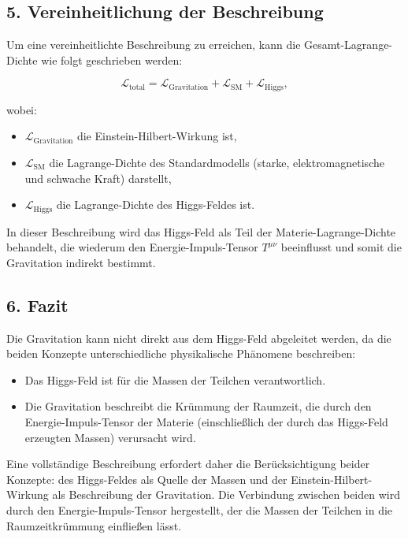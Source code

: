 \documentclass{article}
\begin{document}
	\subsection{5. Vereinheitlichung der Beschreibung}
	
	Um eine vereinheitlichte Beschreibung zu erreichen, kann die Gesamt-Lagrange-Dichte wie folgt geschrieben werden:
	
	\[
	\mathcal{L}_\text{total} = \mathcal{L}_\text{Gravitation} + \mathcal{L}_\text{SM} + \mathcal{L}_\text{Higgs},
	\]
	
	wobei:
	
	\begin{itemize}
		\item $\mathcal{L}_\text{Gravitation}$ die Einstein-Hilbert-Wirkung ist,
		\item $\mathcal{L}_\text{SM}$ die Lagrange-Dichte des Standardmodells (starke, elektromagnetische und schwache Kraft) darstellt,
		\item $\mathcal{L}_\text{Higgs}$ die Lagrange-Dichte des Higgs-Feldes ist.
	\end{itemize}
	
	In dieser Beschreibung wird das Higgs-Feld als Teil der Materie-Lagrange-Dichte behandelt, die wiederum den Energie-Impuls-Tensor $T^{\mu\nu}$ beeinflusst und somit die Gravitation indirekt bestimmt.
	
	\subsection{6. Fazit}
	
	Die Gravitation kann nicht direkt aus dem Higgs-Feld abgeleitet werden, da die beiden Konzepte unterschiedliche physikalische Phänomene beschreiben:
	
	\begin{itemize}
		\item Das Higgs-Feld ist für die Massen der Teilchen verantwortlich.
		\item Die Gravitation beschreibt die Krümmung der Raumzeit, die durch den Energie-Impuls-Tensor der Materie (einschließlich der durch das Higgs-Feld erzeugten Massen) verursacht wird.
	\end{itemize}
	
	Eine vollständige Beschreibung erfordert daher die Berücksichtigung beider Konzepte: des Higgs-Feldes als Quelle der Massen und der Einstein-Hilbert-Wirkung als Beschreibung der Gravitation. Die Verbindung zwischen beiden wird durch den Energie-Impuls-Tensor hergestellt, der die Massen der Teilchen in die Raumzeitkrümmung einfließen lässt.
	
\end{document}
